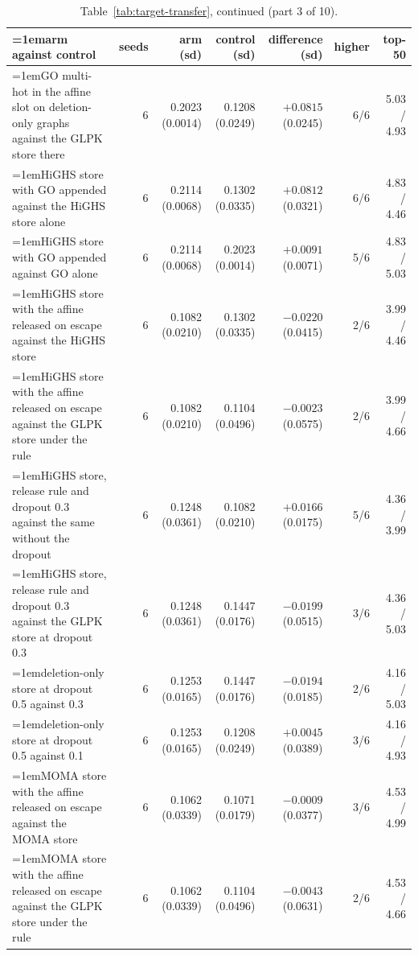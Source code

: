 \begin{table}[H]
  \centering
  \footnotesize
  \setlength{\tabcolsep}{2.5pt}
  \caption[The rounds on betaxanthin: arm against control, continued]{Table~\ref{tab:target-transfer}, continued (part 3 of 10).}
  \label{tab:target-transfer-3}
  \begin{tabular}{@{}>{\raggedright\hangindent=1em\hangafter=1\arraybackslash}p{78.5mm}rrrrrr@{}}
    \hline
    arm against control & seeds & arm (sd) & control (sd) & difference (sd) & higher & top-50 \\
    \hline
    GO multi-hot in the affine slot on deletion-only graphs against the GLPK store there & 6 & 0.2023 (0.0014) & 0.1208 (0.0249) & $+0.0815$ (0.0245) & 6/6 & 5.03 / 4.93 \\
    HiGHS store with GO appended against the HiGHS store alone & 6 & 0.2114 (0.0068) & 0.1302 (0.0335) & $+0.0812$ (0.0321) & 6/6 & 4.83 / 4.46 \\
    HiGHS store with GO appended against GO alone & 6 & 0.2114 (0.0068) & 0.2023 (0.0014) & $+0.0091$ (0.0071) & 5/6 & 4.83 / 5.03 \\
    HiGHS store with the affine released on escape against the HiGHS store & 6 & 0.1082 (0.0210) & 0.1302 (0.0335) & $-0.0220$ (0.0415) & 2/6 & 3.99 / 4.46 \\
    HiGHS store with the affine released on escape against the GLPK store under the rule & 6 & 0.1082 (0.0210) & 0.1104 (0.0496) & $-0.0023$ (0.0575) & 2/6 & 3.99 / 4.66 \\
    HiGHS store, release rule and dropout 0.3 against the same without the dropout & 6 & 0.1248 (0.0361) & 0.1082 (0.0210) & $+0.0166$ (0.0175) & 5/6 & 4.36 / 3.99 \\
    HiGHS store, release rule and dropout 0.3 against the GLPK store at dropout 0.3 & 6 & 0.1248 (0.0361) & 0.1447 (0.0176) & $-0.0199$ (0.0515) & 3/6 & 4.36 / 5.03 \\
    deletion-only store at dropout 0.5 against 0.3 & 6 & 0.1253 (0.0165) & 0.1447 (0.0176) & $-0.0194$ (0.0185) & 2/6 & 4.16 / 5.03 \\
    deletion-only store at dropout 0.5 against 0.1 & 6 & 0.1253 (0.0165) & 0.1208 (0.0249) & $+0.0045$ (0.0389) & 3/6 & 4.16 / 4.93 \\
    MOMA store with the affine released on escape against the MOMA store & 6 & 0.1062 (0.0339) & 0.1071 (0.0179) & $-0.0009$ (0.0377) & 3/6 & 4.53 / 4.99 \\
    MOMA store with the affine released on escape against the GLPK store under the rule & 6 & 0.1062 (0.0339) & 0.1104 (0.0496) & $-0.0043$ (0.0631) & 2/6 & 4.53 / 4.66 \\

\end{tabular}
\end{table}
